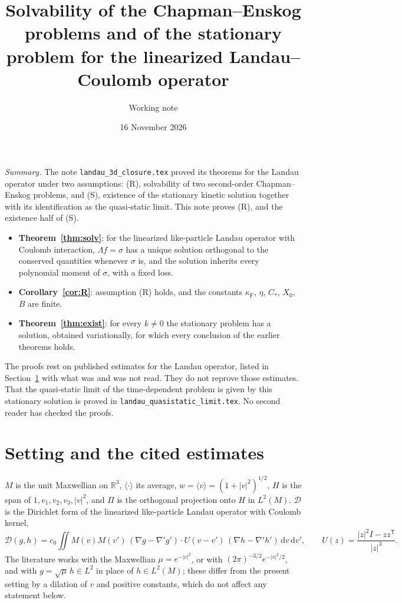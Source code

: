 \documentclass[11pt]{article}
\title{Solvability of the Chapman--Enskog problems and of the stationary
problem for the linearized Landau--Coulomb operator}
\author{Working note}
\date{16 November 2026}
\newcommand{\dd}{\mathrm{d}}
\newcommand{\cD}{\mathcal{D}}
\newcommand{\avg}[1]{\langle #1\rangle}
\newcommand{\jap}[1]{\langle #1\rangle}
\theoremstyle{remark}
\begin{document}
\sloppy
\maketitle

\noindent\emph{Summary.} The note \texttt{landau\_3d\_closure.tex} proved its
theorems for the Landau operator under two assumptions: (R), solvability of
two second-order Chapman--Enskog problems, and (S), existence of the
stationary kinetic solution together with its identification as the
quasi-static limit. This note proves (R), and the existence half of (S).
\begin{itemize}
  \item \textbf{Theorem~\ref{thm:solv}}: for the linearized like-particle
    Landau operator with Coulomb interaction, $\Lambda f=\sigma$ has a unique
    solution orthogonal to the conserved quantities whenever $\sigma$ is, and
    the solution inherits every polynomial moment of $\sigma$, with a fixed
    loss.
  \item \textbf{Corollary~\ref{cor:R}}: assumption (R) holds, and the
    constants $\kappa_{\mathrm F}$, $\eta$, $C_*$, $X_0$, $B$ are finite.
  \item \textbf{Theorem~\ref{thm:exist}}: for every $k\ne0$ the stationary
    problem has a solution, obtained variationally, for which every
    conclusion of the earlier theorems holds.
\end{itemize}
The proofs rest on published estimates for the Landau operator, listed in
Section~\ref{sec:cited} with what was and was not read. They do not reprove
those estimates. That the quasi-static limit of the time-dependent problem is given by this
stationary solution is proved in \texttt{landau\_quasistatic\_limit.tex}. No second
reader has checked the proofs.

\section{Setting and the cited estimates}
\label{sec:cited}

$M$ is the unit Maxwellian on $\mathbb{R}^3$, $\avg{\cdot}$ its average,
$w=\jap{v}=(1+|v|^2)^{1/2}$, $H$ is the span of $1,v_1,v_2,v_3,|v|^2$,
and $\Pi$ is the orthogonal projection onto $H$ in $L^2(M)$. $\cD$ is the
Dirichlet form of the linearized like-particle Landau operator with Coulomb
kernel,
\[
  \cD(g,h)=c_0\iint M(v)M(v')\,(\nabla g-\nabla'g')\cdot U(v-v')\,
  (\nabla h-\nabla'h')\,\dd v\,\dd v',\qquad
  U(z)=\frac{|z|^2I-zz^{\mathsf T}}{|z|^3}.
\]
The literature works with the Maxwellian $\mu=e^{-|v|^2}$, or with
$(2\pi)^{-3/2}e^{-|v|^2/2}$, and with $g=\sqrt\mu\,h\in L^2$ in place of
$h\in L^2(M)$; these differ from the present setting by a dilation of $v$ and
positive constants, which do not affect any statement below.
\end{document}
